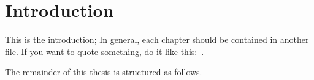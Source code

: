 \chapter{Introduction}
This is the introduction; In general, each chapter should be
contained in another file. If you want to quote something, do it like
this:~\cite{Cavin2002a}.

The remainder of this thesis is structured as follows.
